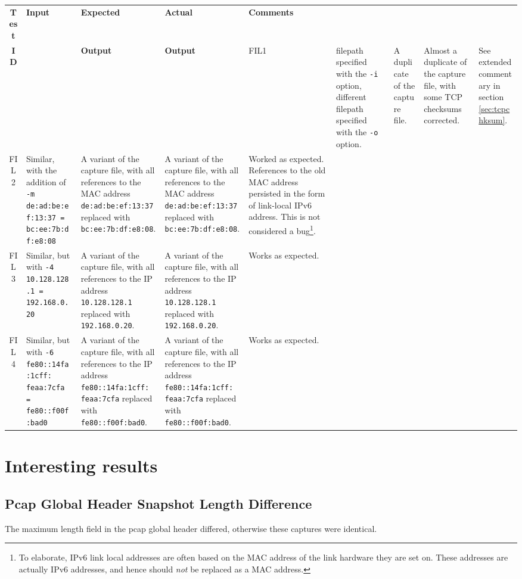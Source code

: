 \documentclass[10pt,a4paper,notitlepage]{report}
\begin{document}
\begin{tabularx}{\textwidth}{|c|X|X|X|X|}
\hline
\textbf{Test} & \textbf{Input} & \textbf{Expected} & \textbf{Actual} & \textbf{Comments}\\
\textbf{ID} & & \textbf{Output} & \textbf{Output} &
\endhead
\hline
FIL1 & filepath specified with the \texttt{-i} option, different filepath specified with the \texttt{-o} option. &
	A duplicate of the capture file. &
	Almost a duplicate of the capture file, with some TCP checksums corrected. &
	See extended commentary in section \ref{sec:tcpchksum}. \\ \hline
FIL2 & Similar, with the addition of \texttt{-m de:ad:be:ef:13:37 = bc:ee:7b:df:e8:08} &
	A variant of the capture file, with all references to the MAC address \texttt{de:ad:be:ef:13:37} replaced with \texttt{bc:ee:7b:df:e8:08}. &
	A variant of the capture file, with all references to the MAC address \texttt{de:ad:be:ef:13:37} replaced with \texttt{bc:ee:7b:df:e8:08}. &
	Worked as expected. References to the old MAC address persisted in the form of link-local IPv6 address. This is not considered a bug\footnote{To elaborate, IPv6 link local addresses are often based on the MAC address of the link hardware they are set on. These addresses are actually IPv6 addresses, and hence should \emph{not} be replaced as a MAC address.}.\\ \hline
FIL3 & Similar, but with \texttt{-4 10.128.128.1 = 192.168.0.20} &
	A variant of the capture file, with all references to the IP address \texttt{10.128.128.1} replaced with \texttt{192.168.0.20}. &
	A variant of the capture file, with all references to the IP address \texttt{10.128.128.1} replaced with \texttt{192.168.0.20}. &
	Works as expected. \\ \hline
FIL4 & Similar, but with \texttt{-6 fe80::14fa:1cff: feaa:7cfa = fe80::f00f:bad0} &
	A variant of the capture file, with all references to the IP address \texttt{fe80::14fa:1cff: feaa:7cfa} replaced with \texttt{fe80::f00f:bad0}. &
	A variant of the capture file, with all references to the IP address \texttt{fe80::14fa:1cff: feaa:7cfa} replaced with \texttt{fe80::f00f:bad0}. &
	Works as expected. \\ \hline
\end{tabularx}

\section{Interesting results}
\subsection{Pcap Global Header Snapshot Length Difference}
\label{sec:intrsnaplen}
The maximum length field in the pcap global header differed, otherwise these captures were identical.
\end{document}
